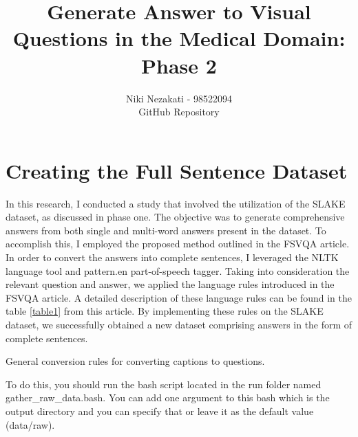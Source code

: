 \documentclass{adonis}
\title{Generate Answer to Visual Questions in the Medical Domain: Phase 2}
\author{Niki Nezakati - 98522094
\\
\href{https://github.com/nikinezakati/medical-gen-vqa/tree/phase-one}{\faicon{github}} GitHub Repository}
\begin{document}
	\maketitle
	\section{Creating the Full Sentence Dataset}
	
       In this research, I conducted a study that involved the utilization of the SLAKE dataset, as discussed in phase one. The objective was to generate comprehensive answers from both single and multi-word answers present in the dataset. To accomplish this, I employed the proposed method outlined in the FSVQA article. In order to convert the answers into complete sentences, I leveraged the NLTK language tool and pattern.en part-of-speech tagger. Taking into consideration the relevant question and answer, we applied the language rules introduced in the FSVQA article. A detailed description of these language rules can be found in the table \ref{table1} from this article. By implementing these rules on the SLAKE dataset, we successfully obtained a new dataset comprising answers in the form of complete sentences.
       

       \begin{table}[h]
        \caption{General conversion rules for converting captions to questions.}
    \label{table1}
\end{table}

To do this, you should run the bash script located in the run folder named gather\_raw\_data.bash. You can add one argument to this bash which is the output directory and you can specify that or leave it as the default value (data/raw).
\end{document}
